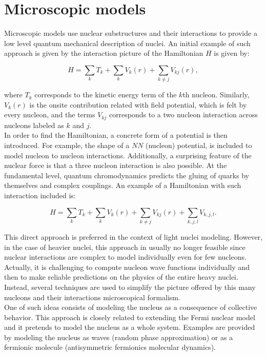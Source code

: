 \documentclass[openany]{book}
\begin{document}
\section{Microscopic models} \label{sec:microscopicalModels}

Microscopic models use nuclear substructures and their interactions to provide a low level quantum mechanical description of nuclei. An initial example of such approach is given by the interaction picture of the Hamiltonian $H$ is given by: 

\begin{equation} \label{eq:micro_hamiltonian}
	H = \sum_{k} T_k + \sum_{k} V_k (r) + \sum_{k \neq j} V_{kj}(r),
\end{equation}

where $T_k$ corresponds to the kinetic energy term of the $k$th nucleon. Similarly, $V_k(r)$ is the onsite contribution related with field potential, which is felt by every nucleon, and the terms $V_{kj}$ corresponds to a two nucleon interaction across nucleons labeled as $k$ and $j$. \\

In order to find the Hamiltonian, a concrete form of a potential is then introduced. For example, the shape of a $NN$ (nucleon) potential, is included to model nucleon to nucleon interactions. Additionally, a surprising feature of the nuclear force is that a three nucleon interaction is also possible. At the fundamental level, quantum chromodynamics predicts the gluing of quarks by themselves and complex couplings. An example of a Hamiltonian with such interaction included is:

\begin{equation} \label{eq:micro_hamiltonian_NNN}
	H = \sum_{k} T_k + \sum_{k} V_k (r) + \sum_{k \neq j} V_{kj}(r) +   \sum_{k, j ,l } {V_{k, j, l}}.
\end{equation}

This direct approach is preferred in the context of light nuclei modeling. However, in the case of heavier nuclei, this approach in usually no longer feasible since nuclear interactions are complex to model individually even for few nucleons. Actually, it is challenging to compute nucleon wave functions individually and then to make reliable predictions on the physics of the entire heavy nuclei. Instead, several techniques are used to simplify the picture offered by this many nucleons and their interactions microscopical formalism. \\

One of such ideas consists of modeling the nucleus as a consequence of collective behavior. This approach is closely related to extending the Fermi nuclear model and it pretends to model the nucleus as a whole system. Examples are provided by modeling the nucleus as waves (random phase approximation) or as a fermionic molecule (antisymmetric fermionics molecular dynamics).  \\
\end{document}
